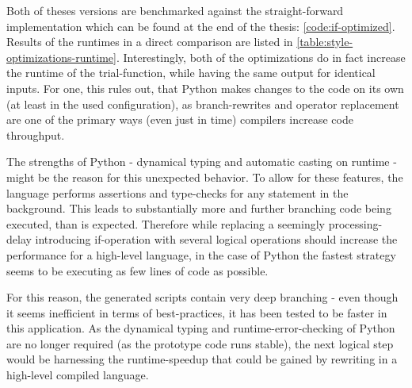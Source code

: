 Both of theses versions are benchmarked against the straight-forward implementation which can be found at the end of the thesis: \ref{code:if-optimized}.
Results of the runtimes in a direct comparison are listed in \autoref{table:style-optimizations-runtime}.
Interestingly, both of the \glqq optimizations\grqq{} do in fact increase the runtime of the trial-function, while having the same output for identical inputs.
For one, this rules out, that Python makes changes to the code on its own (at least in the used configuration), as branch-rewrites and operator replacement are one of the primary ways (even just in time) compilers increase code throughput.

The strengths of Python - dynamical typing and automatic casting on runtime - might be the reason for this unexpected behavior.
To allow for these features, the language performs assertions and type-checks for any statement in the background.
This leads to substantially more and further branching code being executed, than is expected.
Therefore while replacing a seemingly processing-delay introducing if-operation with several logical operations should increase the performance for a high-level language, in the case of Python the fastest strategy seems to be executing as few lines of code as possible.

For this reason, the generated scripts contain very deep branching - even though it seems inefficient in terms of best-practices, it has been tested to be faster in this application.
As the dynamical typing and runtime-error-checking of Python are no longer required (as the prototype code runs stable), the next logical step would be harnessing the runtime-speedup that could be gained by rewriting in a high-level compiled language.